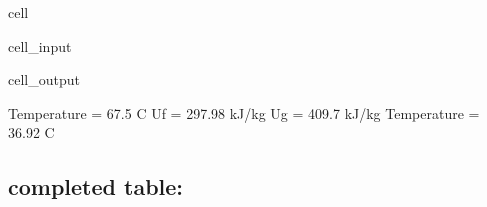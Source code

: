 \documentclass[letterpaper,10pt,english]{jupyterBook}
\begin{document}
\begin{sphinxuseclass}{cell}
\begin{sphinxVerbatimInput}
\begin{sphinxuseclass}{cell_input}
\begin{sphinxVerbatim}[commandchars=\\\{\}]
    
\end{sphinxVerbatim}

\end{sphinxuseclass}\end{sphinxVerbatimInput}
\begin{sphinxVerbatimOutput}

\begin{sphinxuseclass}{cell_output}
\begin{sphinxVerbatim}[commandchars=\\\{\}]
Temperature = 67.5 C
Uf = 297.98 kJ/kg
Ug = 409.7 kJ/kg
Temperature = 36.92 C
\end{sphinxVerbatim}

\end{sphinxuseclass}\end{sphinxVerbatimOutput}

\end{sphinxuseclass}

\subsection{completed table:}
\label{\detokenize{notebooks/Chapter2/complete-table-R134a:completed-table}}
\end{document}
